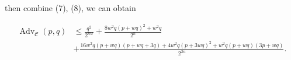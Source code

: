 \noindent then combine (7), (8), we can obtain

$$
\begin{aligned}
\operatorname{Adv}_{\mathcal{C}}\left(p, q\right) &\leq \frac{q^2}{2^{n w}} + \frac{8 w^2 q(p+wq)^2+w^2 q}{2^n}\\
&+ \frac{16 w^2 q(p+w q)(p+w q +3 q)+4 w^2 q(p+3 wq)^2+ w^2q(p+w q)(3p+w q)}{2^{2 n}}.
\end{aligned}
$$




